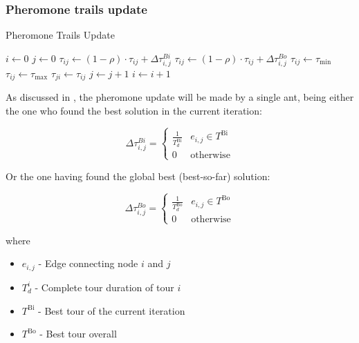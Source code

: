 \begin{homeworkProblem}
\subsubsection{Pheromone trails update}
\begin{algorithm}[!h]
  \caption{Pheromone Trails Update}\label{update}
  \begin{algorithmic}[1]
     \State $i \gets 0$
      \State $j \gets 0$
          \State $\tau_{ij} \gets (1-\rho)\cdot\tau_{ij}+\Delta\tau_{i,j}^{Bi}$
          \Else
          \State $\tau_{ij} \gets (1-\rho)\cdot\tau_{ij}+\Delta\tau_{i,j}^{Bo}$
          \EndIf
            \State $\tau_{ij} \gets \tau_{\min}$
          \EndIf
            \State $\tau_{ij} \gets \tau_{\max}$
          \EndIf
          \State $\tau_{ji} \gets \tau_{ij}$
          \State $ j \gets j + 1$  
        \EndFor
        \State $ i \gets i + 1$ 
      \EndFor
    \EndProcedure
\end{algorithmic}
\end{algorithm}

As discussed in , the pheromone update will be made by a single ant, being either the one who found the best solution in the current iteration: 

\begin{equation}
  \Delta\tau_{i,j}^{Bi} = \begin{cases}
    \frac{1}{T_{d}^{\text{Bi}}} & e_{i,j} \in T^{\text{Bi}}  \\
    0 & \text{otherwise} 
      \end{cases}
\end{equation}

Or the one having found the global best (best-so-far) solution:

\begin{equation}
  \Delta\tau_{i,j}^{Bo} = \begin{cases}
    \frac{1}{T_{d}^{\text{Bo}}} & e_{i,j} \in T^{\text{Bo}}  \\
    0 & \text{otherwise} 
  \end{cases}
\end{equation}

where
\begin{itemize}
\item $e_{i,j}$ - Edge connecting node $i$ and $j$
\item $T_{d}^{i}$ - Complete tour duration of tour $i$
\item $T^{\text{Bi}}$ - Best tour of the current iteration
\item $T^{\text{Bo}}$ - Best tour overall 
\end{itemize}



\end{homeworkProblem}
